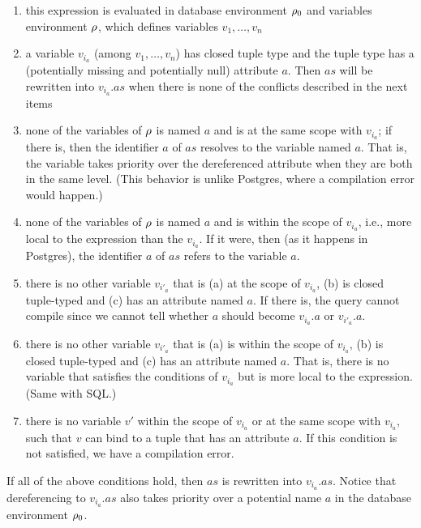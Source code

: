 {\begin{enumerate}
\item this expression is evaluated in database environment $\rho_{0}$ and variables
environment $\rho$, which defines variables $v_1,\ldots,v_n$
\item a variable $v_{i_a}$ (among $v_1,\ldots,v_n$) has closed tuple type and
the tuple type has a (potentially missing and potentially null) attribute $a$.
Then $as$ will be rewritten into $v_{i_a}.as$ when there is none of the
conflicts described in the next items
\item none of the variables of $\rho$ is named $a$ and is at the same scope with
$v_{i_a}$; if there is, then the identifier $a$ of $as$ resolves to the variable
named $a$. That is, the variable takes priority over the dereferenced attribute
when they are both in the same level. (This behavior is unlike Postgres, where a
compilation error would happen.)
\item none of the variables of $\rho$ is named $a$ and is within the scope of
$v_{i_a}$, i.e., more local to the expression than the $v_{i_a}$. If it were,
then (as it happens in Postgres), the identifier $a$ of $as$ refers to the
variable $a$.
\item there is no other variable $v_{i'_a}$ that is (a) at the scope of
$v_{i_a}$, (b) is closed tuple-typed and (c) has an attribute named $a$. If
there is, the query cannot compile since we cannot tell whether $a$ should
become $v_{i_a}.a$ or $v_{i'_a}.a$. 
\item there is no other variable $v_{i'_a}$ that is (a) is within the scope of
$v_{i_a}$, (b) is closed tuple-typed and (c) has an attribute named $a$.  That
is, there is no variable that satisfies the conditions of $v_{i_a}$ but is more
local to the expression. (Same with SQL.) 
\item\label{item:stability-req} there is no variable $v'$ within the scope of
$v_{i_a}$ or at the same scope with $v_{i_a}$, such that $v$ can bind to a tuple
that has an attribute $a$. If this condition is not satisfied, we have a
compilation error. 
\end{enumerate}
\noindent If all of the above conditions hold, then $as$ is rewritten into
$v_{i_a}.as$. Notice that dereferencing to $v_{i_a}.as$ also takes priority over
a potential name $a$ in the database environment $\rho_{0}$. 



}
